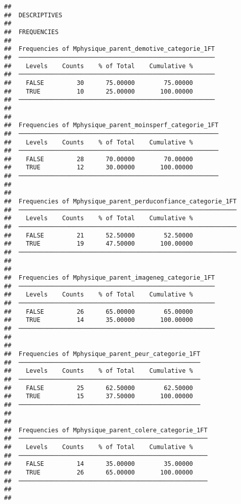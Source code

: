 \documentclass[
]{article}
\begin{document}
\begin{verbatim}
## 
##  DESCRIPTIVES
## 
##  FREQUENCIES
## 
##  Frequencies of Mphysique_parent_demotive_categorie_1FT 
##  ────────────────────────────────────────────────────── 
##    Levels    Counts    % of Total    Cumulative %   
##  ────────────────────────────────────────────────────── 
##    FALSE         30      75.00000        75.00000   
##    TRUE          10      25.00000       100.00000   
##  ────────────────────────────────────────────────────── 
## 
## 
##  Frequencies of Mphysique_parent_moinsperf_categorie_1FT 
##  ─────────────────────────────────────────────────────── 
##    Levels    Counts    % of Total    Cumulative %   
##  ─────────────────────────────────────────────────────── 
##    FALSE         28      70.00000        70.00000   
##    TRUE          12      30.00000       100.00000   
##  ─────────────────────────────────────────────────────── 
## 
## 
##  Frequencies of Mphysique_parent_perduconfiance_categorie_1FT 
##  ──────────────────────────────────────────────────────────── 
##    Levels    Counts    % of Total    Cumulative %   
##  ──────────────────────────────────────────────────────────── 
##    FALSE         21      52.50000        52.50000   
##    TRUE          19      47.50000       100.00000   
##  ──────────────────────────────────────────────────────────── 
## 
## 
##  Frequencies of Mphysique_parent_imageneg_categorie_1FT 
##  ────────────────────────────────────────────────────── 
##    Levels    Counts    % of Total    Cumulative %   
##  ────────────────────────────────────────────────────── 
##    FALSE         26      65.00000        65.00000   
##    TRUE          14      35.00000       100.00000   
##  ────────────────────────────────────────────────────── 
## 
## 
##  Frequencies of Mphysique_parent_peur_categorie_1FT 
##  ────────────────────────────────────────────────── 
##    Levels    Counts    % of Total    Cumulative %   
##  ────────────────────────────────────────────────── 
##    FALSE         25      62.50000        62.50000   
##    TRUE          15      37.50000       100.00000   
##  ────────────────────────────────────────────────── 
## 
## 
##  Frequencies of Mphysique_parent_colere_categorie_1FT 
##  ──────────────────────────────────────────────────── 
##    Levels    Counts    % of Total    Cumulative %   
##  ──────────────────────────────────────────────────── 
##    FALSE         14      35.00000        35.00000   
##    TRUE          26      65.00000       100.00000   
##  ──────────────────────────────────────────────────── 
## 
## 

\end{verbatim}
\end{document}

